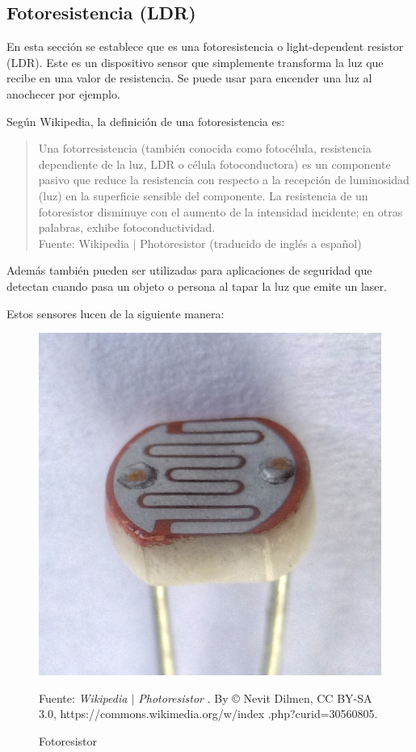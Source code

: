 \documentclass{article}
\begin{document}
\subsection{Fotoresistencia (LDR)}

En esta sección se establece que es una fotoresistencia o light-dependent
resistor (LDR). Este es un dispositivo sensor que simplemente transforma la
luz que recibe en una valor de resistencia. Se puede usar para encender una
luz al anochecer por ejemplo.

\bigbreak

Según Wikipedia, la definición de una fotoresistencia es:

\begin{quote}
Una fotorresistencia (también conocida como fotocélula, resistencia
dependiente de la luz, LDR o célula fotoconductora) es un componente pasivo
que reduce la resistencia con respecto a la recepción de luminosidad (luz) en
la superficie sensible del componente. La resistencia de un fotoresistor
disminuye con el aumento de la intensidad incidente; en otras palabras,
exhibe fotoconductividad.\\ \footnotesize
Fuente: Wikipedia $\mid$ Photoresistor (traducido de inglés a español)
\cite{wikipedia-ldr-2022}
\end{quote}

Además también pueden ser utilizadas para aplicaciones de seguridad que
detectan cuando pasa un objeto o persona al tapar la luz que emite un laser.

\bigbreak

Estos sensores lucen de la siguiente manera:

\begin{figure}[H]
\centering
\includegraphics[width=0.2\paperwidth]{images/ldr.jpg}
\caption{Fotoresistor}\footnotesize
Fuente: \textit{Wikipedia $\mid$ Photoresistor} \cite{wikipedia-ldr-2022}. By
© Nevit Dilmen, CC BY-SA 3.0, https://commons.wikimedia.org/w/index
.php?curid=30560805.
\end{figure}
\end{document}

